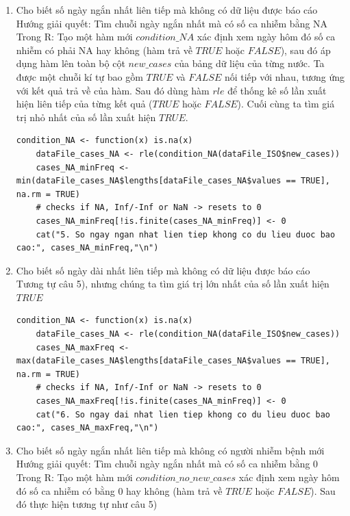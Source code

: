 \documentclass[a4paper]{article}
\theoremstyle{definition}
\begin{document}
\begin{enumerate}[1)]
    \item Cho biết số ngày ngắn nhất liên tiếp mà không có dữ liệu được báo cáo\\
    Hướng giải quyết: Tìm chuỗi ngày ngắn nhất mà có số ca nhiễm bằng NA\\
    Trong R: Tạo một hàm mới $condition\_NA$ xác định xem ngày hôm đó số ca nhiễm có phải NA hay không (hàm trả về $TRUE$ hoặc $FALSE$), sau đó áp dụng hàm lên toàn bộ cột $new\_cases$ của bảng dữ liệu của từng nước. Ta được một chuỗi kí tự bao gồm $TRUE$ và $FALSE$ nối tiếp với nhau, tương ứng với kết quả trả về của hàm. Sau đó dùng hàm $rle$ để thống kê số lần xuất hiện liên tiếp của từng kết quả ($TRUE$ hoặc $FALSE$). Cuối cùng ta tìm giá trị nhỏ nhất của số lần xuất hiện $TRUE$.
    \begin{lstlisting}[gobble=4]
    condition_NA <- function(x) is.na(x)
    dataFile_cases_NA <- rle(condition_NA(dataFile_ISO$new_cases))
    cases_NA_minFreq <- min(dataFile_cases_NA$lengths[dataFile_cases_NA$values == TRUE], na.rm = TRUE)
    # checks if NA, Inf/-Inf or NaN -> resets to 0
    cases_NA_minFreq[!is.finite(cases_NA_minFreq)] <- 0
    cat("5. So ngay ngan nhat lien tiep khong co du lieu duoc bao cao:", cases_NA_minFreq,"\n")
    \end{lstlisting}
    \item Cho biết số ngày dài nhất liên tiếp mà không có dữ liệu được báo cáo\\
    Tương tự câu 5), nhưng chúng ta tìm giá trị lớn nhất của số lần xuất hiện $TRUE$
    \begin{lstlisting}[gobble=4]
    condition_NA <- function(x) is.na(x)
    dataFile_cases_NA <- rle(condition_NA(dataFile_ISO$new_cases))
    cases_NA_maxFreq <- max(dataFile_cases_NA$lengths[dataFile_cases_NA$values == TRUE], na.rm = TRUE)
    # checks if NA, Inf/-Inf or NaN -> resets to 0
    cases_NA_maxFreq[!is.finite(cases_NA_minFreq)] <- 0
    cat("6. So ngay dai nhat lien tiep khong co du lieu duoc bao cao:", cases_NA_maxFreq,"\n")
    \end{lstlisting}
    \item Cho biết số ngày ngắn nhất liên tiếp mà không có người nhiễm bệnh mới\\
    Hướng giải quyết: Tìm chuỗi ngày ngắn nhất mà có số ca nhiễm bằng 0\\
    Trong R: Tạo một hàm mới $condition\_no\_new\_cases$ xác định xem ngày hôm đó số ca nhiễm có bằng 0 hay không (hàm trả về $TRUE$ hoặc $FALSE$). Sau đó thực hiện tương tự như câu 5)
    \begin{lstlisting}[gobble=4]

\end{lstlisting}
\end{enumerate}
\end{document}
